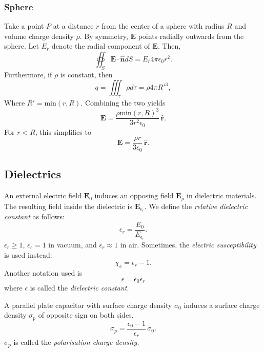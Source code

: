 \documentclass[a4paper, 12pt]{article}
\renewcommand{\vec}[1]{\mathbf{#1}}
\newcommand{\E}{\ensuremath{\vec{E}}}
\newcommand{\e}{\ensuremath{\epsilon_0}}
\let\tmp\hat
\renewcommand{\hat}[1]{\vec{\tmp{#1}}}
\begin{document}
    \subsubsection{Sphere}
        Take a point $P$ at a distance $r$ from the center of a sphere with radius $R$ and volume charge density $\rho$. 
        By symmetry, $\E$ points radially outwards from the sphere. Let $E_r$ denote the radial component of $\E$. Then, 
        \begin{equation*}
            \oiint_S \E\cdot\hat{n}dS = E_r4\pi\e r^2.
        \end{equation*}
        Furthermore, if $\rho$ is constant, then
        \begin{equation*}
            q = \iiint_\tau \rho d\tau = \rho4\pi R'^3,
        \end{equation*}
        Where $R' = \text{min}(r, R)$. Combining the two yields
        \begin{equation}
            \E = \frac{\rho \text{min}(r, R)^3}{3r^2\e}\,\hat{r}.
        \end{equation}
        For $r < R$, this simplifies to
        \begin{equation}
            \E = \frac{\rho r}{3\e}\,\hat{r}.
        \end{equation}

\subsection{Dielectrics}    
    An external electric field $\E_0$ induces an opposing field $\E_p$ in dielectric materials. 
    The resulting field inside the dielectric is $\E_{\epsilon_r}$. We define the \textit{relative dielectric constant} as follows: 
    \begin{equation}
        \epsilon_r = \frac{E_0}{E_{\epsilon_r}}.
    \end{equation}
    $\epsilon_r \geq 1$,  $\epsilon_r = 1$ in vacuum, and $\epsilon_r \approx 1$ in air.
    Sometimes, the \textit{electric susceptibility} is used instead:
    \begin{equation}
        \chi_e = \epsilon_r -1.
    \end{equation}
    Another notation used is 
    \begin{equation}
        \epsilon = \e\epsilon_r
    \end{equation}
    where $\epsilon$ is called the \textit{dielectric constant}.
    
    A parallel plate capacitor with surface charge density $\sigma_0$ induces a surface charge density $\sigma_p$ of opposite sign on both sides. 
    \begin{equation}
        \sigma_p = \frac{\e -1}{\epsilon_r}\,\sigma_0.
    \end{equation}
    $\sigma_p$ is called the \textit{polarisation charge density}.
    
\end{document}
